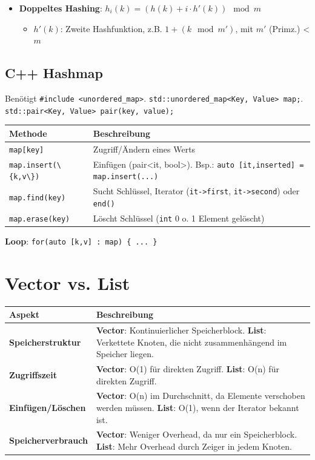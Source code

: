 \documentclass[8pt, landscape]{article}
\newcommand{\formel}[1]{\ensuremath{#1}}
\newcommand{\datastruct}[1]{\textbf{\textcolor{red!60!black}{#1}}}
\begin{document}
\begin{multicols*}{4}
\begin{itemize}
\item \datastruct{Doppeltes Hashing}: \formel{h_i(k) = (h(k) + i \cdot h'(k)) \mod m}

\begin{itemize}
    \item \formel{h'(k)}: Zweite Hashfunktion, z.B. \formel{1 + (k \mod m')}, mit \formel{m'} (Primz.) < \formel{m}
\end{itemize}
\end{itemize}

\subsection*{C++ Hashmap}
Benötigt \lstinline|#include <unordered_map>|. \lstinline|std::unordered_map<Key, Value> map;|. \lstinline|std::pair<Key, Value> pair(key, value);|

\noindent
\begin{tabularx}{\linewidth}{l >{\RaggedRight}X}
\toprule
\textbf{Methode} & \textbf{Beschreibung} \\
\midrule
\lstinline|map[key]| & Zugriff/Ändern eines Werts \\
\lstinline|map.insert(\{k,v\})| & Einfügen (pair<it, bool>). Bsp.: \lstinline|auto [it,inserted] = map.insert(...)| \\
\lstinline|map.find(key)| & Sucht Schlüssel, Iterator (\lstinline|it->first|, \lstinline|it->second|) oder \lstinline|end()| \\
\lstinline|map.erase(key)| & Löscht Schlüssel (\lstinline|int| 0 o. 1 Element gelöscht) \\
\bottomrule
\end{tabularx}
\datastruct{Loop}: \lstinline|for(auto [k,v] : map) { ... }|

\section{Vector vs. List}

\noindent
\begin{tabularx}{\linewidth}{l >{\RaggedRight}X}
\toprule
\textbf{Aspekt} & \textbf{Beschreibung} \\
\midrule
\textbf{Speicherstruktur} & \datastruct{Vector}: Kontinuierlicher Speicherblock. \newline \datastruct{List}: Verkettete Knoten, die nicht zusammenhängend im Speicher liegen. \\
\textbf{Zugriffszeit} & \datastruct{Vector}: O(1) für direkten Zugriff. \newline \datastruct{List}: O(n) für direkten Zugriff. \\
\textbf{Einfügen/Löschen} & \datastruct{Vector}: O(n) im Durchschnitt, da Elemente verschoben werden müssen. \newline \datastruct{List}: O(1), wenn der Iterator bekannt ist. \\ 
\textbf{Speicherverbrauch} & \datastruct{Vector}: Weniger Overhead, da nur ein Speicherblock. \newline \datastruct{List}: Mehr Overhead durch Zeiger in jedem Knoten. \\
\bottomrule
\end{tabularx}


\end{multicols*}
\end{document}
